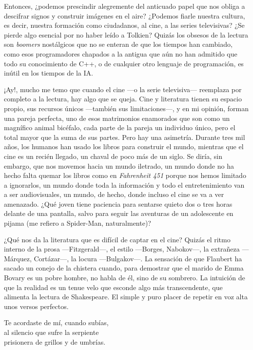 Entonces, ¿podemos prescindir alegremente del anticuado papel que nos obliga a descifrar signos y construir imágenes en el aire? ¿Podemos fiarle nuestra cultura, es decir, nuestra formación como ciudadanos, al cine, a las series televisivas? ¿Se pierde algo esencial por no haber leído a Tolkien? Quizás los obsesos de la lectura son \emph{boomers} nostálgicos que no se enteran de que los tiempos han cambiado, como esos programadores chapados a la antigua que aún no han admitido que todo su conocimiento de C++, o de cualquier otro lenguaje de programación, es inútil en los tiempos de la IA.

¡Ay!, mucho me temo que cuando el cine ---o la serie televisiva--- reemplaza por completo a la lectura, hay algo que se queja. Cine y literatura tienen su espacio propio, sus recursos únicos ---también sus limitaciones---, y en mi opinión, forman una pareja perfecta, uno de esos matrimonios enamorados que son como un magnífico animal bicéfalo, cada parte de la pareja un individuo único, pero el total mayor que la suma de sus partes. Pero hay una asimetría. Durante tres mil años, los humanos han usado los libros para construir el mundo, mientras que el cine es un recién llegado, un chaval de poco más de un siglo. Se diría, sin embargo, que nos movemos hacia un mundo iletrado, un mundo donde no ha hecho falta quemar los libros como en \emph{Fahrenheit 451} porque nos hemos limitado a ignorarlos, un mundo donde toda la información y todo el entretenimiento van a ser audiovisuales, un mundo, de hecho, donde incluso el cine se va a ver amenazado. ¿Qué joven tiene paciencia para sentarse quieto dos o tres horas delante de una pantalla, salvo para seguir las aventuras de un adolescente en pijama (me refiero a Spider-Man, naturalmente)?

¿Qué nos da la literatura que es difícil de captar en el cine? Quizás el ritmo interno de la prosa ---Fitzgerald---, el estilo ---Borges, Nabokov---, la extrañeza ---Márquez, Cortázar---, la locura ---Bulgakov---. La sensación de que Flaubert ha sacado un conejo de la chistera cuando, para demostrar que el marido de Emma Bovary es un pobre hombre, no habla de él, sino de su sombrero. La intuición de que la realidad es un tenue velo que esconde algo más transcendente, que alimenta la lectura de Shakespeare. El simple y puro placer de repetir en voz alta unos versos perfectos.

\begin{versocita}
Te acordaste de mí, cuando subías,\\
al silencio que sufre la serpiente\\
prisionera de grillos y de umbrías.
\end{versocita}

